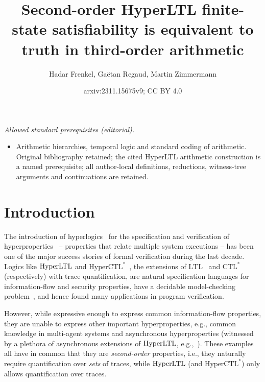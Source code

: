 \documentclass[dvipsnames,10pt,a4paper]{amsart}
\title{Second-order HyperLTL finite-state satisfiability is equivalent to truth in third-order arithmetic}
\author{Hadar Frenkel, Gaëtan Regaud, Martin Zimmermann}
\date{arxiv:2311.15675v9; CC BY 4.0}
\theoremstyle{definition}
\theoremstyle{remark}
\newcommand{\ltl}{\mathrm{LTL}\xspace}
\newcommand{\ctlstar}{\mathrm{CTL^*}\xspace}
\newcommand{\hyltl}{\mathrm{Hyper\-LTL}\xspace}
\newcommand{\hyctlstar}{\mathrm{HyperCTL^*}\xspace}
\begin{document}
\maketitle
\noindent\textit{Allowed standard prerequisites (editorial).}\begin{itemize}
\item Arithmetic hierarchies, temporal logic and standard coding of arithmetic. Original bibliography retained; the cited HyperLTL arithmetic construction is a named prerequisite; all author-local definitions, reductions, witness-tree arguments and continuations are retained.
\end{itemize}\medskip

\section{Introduction}
\label{sec:intro}

The introduction of hyperlogics~\cite{ClarksonFKMRS14} for the specification and verification of hyperproperties~\cite{ClarksonS10} -- properties that relate multiple system executions -- has been one of the major success stories of formal verification during the last decade.
Logics like $\hyltl$ and $\hyctlstar$~\cite{ClarksonFKMRS14}, the extensions of $\ltl$~\cite{Pnueli77} 
and $\ctlstar$~\cite{EmersonH86} (respectively) with trace quantification, are natural specification languages for information-flow and security properties, have a decidable model-checking problem~\cite{FinkbeinerRS15}, and hence found many applications in program verification.

However, while expressive enough to express common information-flow properties, they are unable to express other important hyperproperties, e.g., common knowledge in multi-agent systems and asynchronous hyperproperties (witnessed by a plethora of asynchronous extensions of $\hyltl$, e.g.,~\cite{BartocciHNC23,DBLP:conf/cav/BaumeisterCBFS21,BeutnerF23,DBLP:journals/corr/abs-2404-16778,DBLP:conf/lics/BozzelliPS21,DBLP:conf/concur/BozzelliPS22,DBLP:journals/pacmpl/GutsfeldMO21,DBLP:conf/mfcs/KontinenSV23,KontinenSV24,DBLP:conf/mfcs/KrebsMV018}).
These examples all have in common that they are \emph{second-order} properties, i.e., they naturally require quantification over \emph{sets} of traces, while $\hyltl$ (and $\hyctlstar$) only allows quantification over traces.
\end{document}
